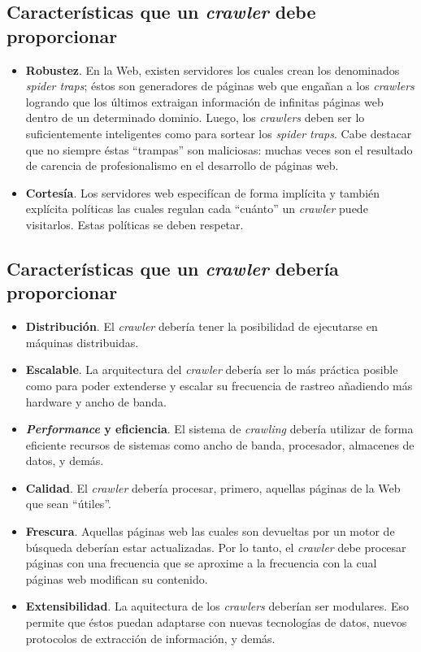 	\subsection{Características que un \textit{crawler} debe proporcionar}
		\begin{itemize}
			\item \textbf{Robustez}. En la Web, existen servidores los cuales crean los denominados \textit{spider traps}; éstos son generadores de páginas web que engañan a los \textit{crawlers} logrando que los últimos extraigan información de infinitas páginas web dentro de un determinado dominio. Luego, los \textit{crawlers} deben ser lo suficientemente inteligentes como para sortear los \textit{spider traps}. Cabe destacar que no siempre éstas \enquote{trampas} son maliciosas: muchas veces son el resultado de carencia de profesionalismo en el desarrollo de páginas web.
			\item \textbf{Cortesía}. Los servidores web especifícan de forma implícita y también explícita políticas las cuales regulan cada  \enquote{cuánto} un \textit{crawler} puede visitarlos. Estas políticas se deben respetar.
		\end{itemize}
	
	\subsection{Características que un \textit{crawler} debería proporcionar}
		\begin{itemize}
			\item \textbf{Distribución}. El \textit{crawler} debería tener la posibilidad de ejecutarse en máquinas distribuidas.
			\item \textbf{Escalable}. La arquitectura del \textit{crawler} debería ser lo más práctica posible como para poder extenderse y escalar su frecuencia de rastreo añadiendo más hardware y ancho de banda.
			\item \textbf{\textit{Performance} y eficiencia}. El sistema de \textit{crawling} debería utilizar de forma eficiente recursos de sistemas como ancho de banda, procesador, almacenes de datos, y demás.
			\item \textbf{Calidad}. El \textit{crawler} debería procesar, primero, aquellas páginas de la Web que sean \enquote{útiles}.
			\item \textbf{Frescura}. Aquellas páginas web las cuales son devueltas por un motor de búsqueda deberían estar actualizadas. Por lo tanto, el \textit{crawler} debe procesar páginas con una frecuencia que se aproxime a la frecuencia con la cual páginas web modifican su contenido.
			\item \textbf{Extensibilidad}. La aquitectura de los \textit{crawlers} deberían ser modulares. Eso permite que éstos puedan adaptarse con nuevas tecnologías de datos, nuevos protocolos de extracción de información, y demás.
		\end{itemize}
		
